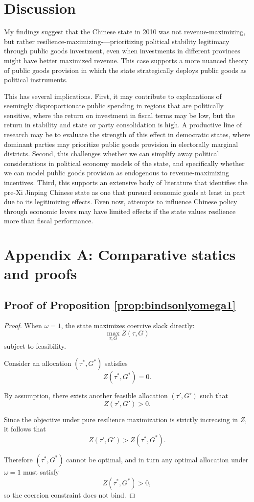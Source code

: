 \documentclass[12pt]{article}
\begin{document}
\section{Discussion}

My findings suggest that the Chinese state in 2010 was not revenue-maximizing, but rather resilience-maximizing-—prioritizing political stability legitimacy through public goods investment, even when investments in different provinces might have better maximized revenue. This case supports a more nuanced theory of public goods provision in which the state strategically deploys public goods as political instruments.

This has several implications. First, it may contribute to explanations of seemingly disproportionate public spending in regions that are politically sensitive, where the return on investment in fiscal terms may be low, but the return in stability and state or party consolidation is high. A productive line of research may be to evaluate the strength of this effect in democratic states, where dominant parties may prioritize public goods provision in electorally marginal districts. Second, this challenges whether we can simplify away political considerations in political economy models of the state, and specifically whether we can model public goods provision as endogenous to revenue-maximizing incentives. Third, this supports an extensive body of literature that identifies the pre-Xi Jinping Chinese state as one that pursued economic goals at least in part due to its legitimizing effects. Even now, attempts to influence Chinese policy through economic levers may have limited effects if the state values resilience more than fiscal performance.

\newpage

\section*{Appendix A: Comparative statics and proofs}

\subsection{Proof of Proposition \ref{prop:bindsonlyomega1}}

\begin{proof}
When \(\omega=1\), the state maximizes coercive slack directly:
\[
\max_{\tau,G} Z(\tau,G)
\]
subject to feasibility.

Consider an allocation \((\tau^*,G^*)\) satisfies
\[\label{eq:Ztaustar}
Z(\tau^*,G^*)=0.
\]

By assumption, there exists another feasible allocation \((\tau',G')\) such that
\[
Z(\tau',G')>0.
\]

Since the objective under pure resilience maximization is strictly increasing in \(Z\), it follows that
\[
Z(\tau',G') > Z(\tau^*,G^*).
\]

Therefore \((\tau^*,G^*)\) cannot be optimal, and in turn any optimal allocation under \(\omega=1\) must satisfy
\[
Z(\tau^*,G^*)>0,
\]
so the coercion constraint does not bind.
\end{proof}
\end{document}
